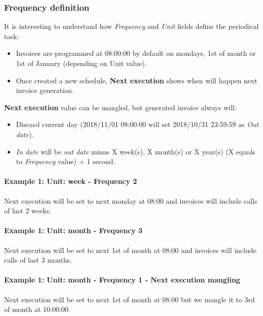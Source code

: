 \documentclass[letterpaper,10pt,english]{sphinxmanual}
\begin{document}
\subsubsection{Frequency definition}
\label{administration_portal/brand/invoicing/invoice_schedulers:frequency-definition}
It is interesting to understand how \emph{Frequency} and \emph{Unit} fields define the periodical task:
\begin{itemize}
\item {} 
Invoices are programmed at 08:00:00 by default on mondays, 1st of month or 1st of January (depending on Unit value).

\item {} 
Once created a new schedule, \textbf{Next execution} shows when will happen next invoice generation.

\end{itemize}

\textbf{Next execution} value can be mangled, but generated invoice always will:
\begin{itemize}
\item {} 
Discard current day (2018/11/01 08:00:00 will set 2018/10/31 23:59:59 as \emph{Out date}).

\item {} 
\emph{In date} will be \emph{out date} minus X week(s), X month(s) or X year(s) (X equals to \emph{Frequency} value) + 1 second.

\end{itemize}
\paragraph{Example 1: Unit: week - Frequency 2}

Next execution will be set to next monday at 08:00 and invoices will include calls of last 2 weeks.
\paragraph{Example 1: Unit: month - Frequency 3}

Next execution will be set to next 1st of month at 08:00 and invoices will include calls of last 3 months.
\paragraph{Example 1: Unit: month - Frequency 1 - Next execution mangling}

Next execution will be set to next 1st of month at 08:00 but we mangle it to 3rd of month at 10:00:00.
\end{document}
